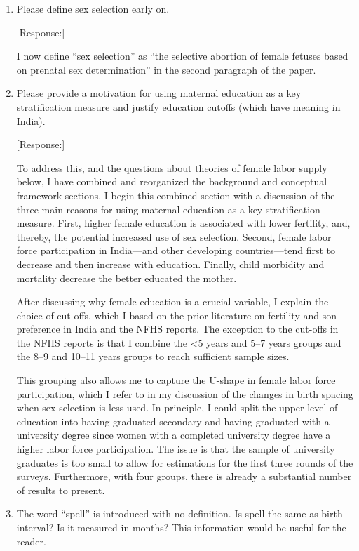 \documentclass[letterpaper,12pt]{article}
\begin{document}
\begin{enumerate}
\item Please define sex selection early on.

[Response:] 

I now define ``sex selection'' as ``the selective abortion of female fetuses 
based on prenatal sex determination'' in the second paragraph of the paper.


\item Please provide a motivation for using maternal education as a key
stratification measure and justify education cutoffs (which have meaning
in India).

[Response:] 

To address this, and the questions about theories of female labor supply below, I have
combined and reorganized the background and conceptual framework sections.
I begin this combined section with a discussion of the three main reasons for using 
maternal education as a key stratification measure.
First, higher female education is associated with lower fertility, and, thereby, the 
potential increased use of sex selection. 
Second, female labor force participation in India---and other developing countries---tend 
first to decrease and then increase with education. 
Finally, child morbidity and mortality decrease the better educated the mother.


After discussing why female education is a crucial variable, I explain the choice of 
cut-offs, which I based on the prior literature on fertility and son preference in India 
and the NFHS reports.
The exception to the cut-offs in the NFHS reports is that I combine
the <5 years and 5--7 years groups and 
the 8--9 and 10--11 years groups to reach sufficient sample sizes.

This grouping also allows me to capture the U-shape in female labor force participation,
which I refer to in my discussion of the changes in birth spacing when sex selection
is less used.
In principle, I could split the upper level of education into having graduated secondary 
and having graduated with a university degree since women with a completed university 
degree have a higher labor force participation. 
The issue is that the sample of university graduates is too small to allow for estimations 
for the first three rounds of the surveys. 
Furthermore, with four groups, there is already a substantial number of results to present.


\item The word ``spell'' is introduced with no definition. Is spell the
same as birth interval? Is it measured in months? This information would
be useful for the reader.


\end{enumerate}
\end{document}
